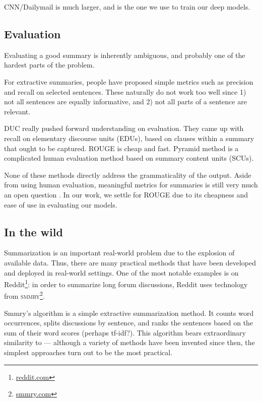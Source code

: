 \documentclass[11pt]{report}
\begin{document}
CNN/Dailymail is much larger, and is the one we use to train our deep models.


\subsection{Evaluation}

Evaluating a good summary is inherently ambiguous, and probably one of the hardest parts of the problem.

For extractive summaries, people have proposed simple metrics such as precision and recall on selected sentences. These naturally do not work too well since 1) not all sentences are equally informative, and 2) not all parts of a sentence are relevant.

DUC really pushed forward understanding on evaluation. They came up with recall on elementary discourse units (EDUs), based on clauses within a summary that ought to be captured. ROUGE \cite{lin2004rouge} is cheap and fast. Pyramid method is a complicated human evaluation method based on summary content units (SCUs). 

None of these methods directly address the grammaticality of the output. Aside from using human evaluation, meaningful metrics for summaries is still very much an open question \citep{toutanova2016summarymetrics}. In our work, we settle for ROUGE due to its cheapness and ease of use in evaluating our models.


\subsection{In the wild}

Summarization is an important real-world problem due to the explosion of available data. Thus, there are many practical methods that have been developed and deployed in real-world settings. One of the most notable examples is on Reddit\footnote{\url{reddit.com}}: in order to summarize long forum discussions, Reddit uses technology from \textsc{smmry}\footnote{\url{smmry.com}}.

Smmry's algorithm is a simple extractive summarization method. It counts word occurrences, splits discussions by sentence, and ranks the sentences based on the sum of their word scores (perhaps tf-idf?). This algorithm bears extraordinary similarity to \citet{luhn1958automatic} --- although a variety of methods have been invented since then, the simplest approaches turn out to be the most practical.

\end{document}
